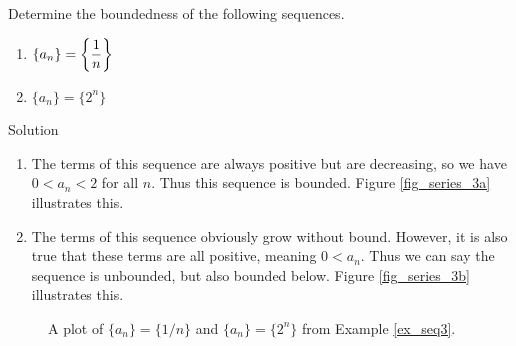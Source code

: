 \begin{example}\label{ex_seq3}
Determine the boundedness of the following sequences.
\begin{multicols}{2}
\begin{enumerate}
\item $\displaystyle\{a_n\}  = \left\{\frac1n\right\}$ 
\columnbreak
\vspace*{0.01cm}
\item $\{a_n\} = \{2^n\}$ 
\vspace*{0.2cm}
 \end{enumerate}
 \end{multicols}
 
 
Solution 

\begin{enumerate}
\item		The terms of this sequence are always positive but are decreasing, so we have $0<a_n<2$ for all $n$. Thus this sequence is bounded. Figure \ref{fig_series_3a} illustrates this.

\item		The terms of this sequence obviously grow without bound. However, it is also true that these terms are all positive, meaning $0<a_n$. Thus we can say the sequence is unbounded, but also bounded below. Figure \ref{fig_series_3b} illustrates this.

\end{enumerate}
\begin{figure}[H]
\centering
\qquad
{}
\caption{A plot of $\{a_n\} = \{1/n\}$ and $\{a_n\} = \{2^n\}$ from Example \ref{ex_seq3}.}
\end{figure}

\end{example}

